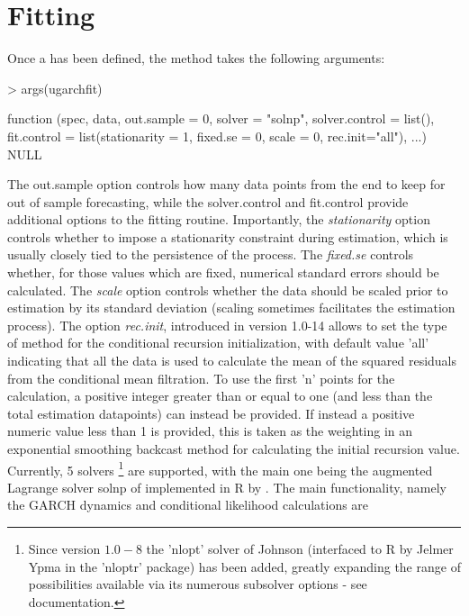 \section{Fitting}\label{section:fitting}
Once a \verb@uGARCHspec@ has been defined, the \verb@ugarchfit@ method takes
the following arguments:
\begin{Schunk}
\begin{Sinput}
> args(ugarchfit)
\end{Sinput}
\begin{Soutput}
function (spec, data, out.sample = 0, solver = "solnp", solver.control = list(),
    fit.control = list(stationarity = 1, fixed.se = 0, scale = 0, rec.init="all"),
    ...)
NULL
\end{Soutput}
\end{Schunk}
The out.sample option controls how many data points from the end to keep for out
of sample forecasting, while the solver.control and fit.control provide additional
options to the fitting routine. Importantly, the \emph{stationarity} option controls
whether to impose a stationarity constraint during estimation, which is usually
closely tied to the persistence of the process. The \emph{fixed.se} controls
whether, for those values which are fixed, numerical standard errors should be
calculated. The \emph{scale} option controls whether the data should be scaled prior
to estimation by its standard deviation (scaling sometimes facilitates the estimation
process). The option \emph{rec.init}, introduced in version 1.0-14 allows to set
the type of method for the conditional recursion initialization, with default
value 'all' indicating that all the data is used to calculate the mean of the
squared residuals from the conditional mean filtration. To use the first 'n' points
for the calculation, a positive integer greater than or equal to one (and less than
the total estimation datapoints) can instead be provided. If instead a positive
numeric value less than 1 is provided, this is taken as the weighting in an
exponential smoothing backcast method for calculating the initial recursion value.\\
Currently, 5 solvers \footnote{Since version $1.0-8$ the
'nlopt' solver of Johnson (interfaced to R by Jelmer Ypma in the 'nloptr' package)
has  been added, greatly expanding the range of possibilities available via its
numerous subsolver options - see documentation.} are supported, with the main
one being the augmented Lagrange solver solnp of \cite{Ye1997} implemented in R by
\cite{Ghalanos2011}.
The main functionality, namely the GARCH dynamics and conditional likelihood calculations are
